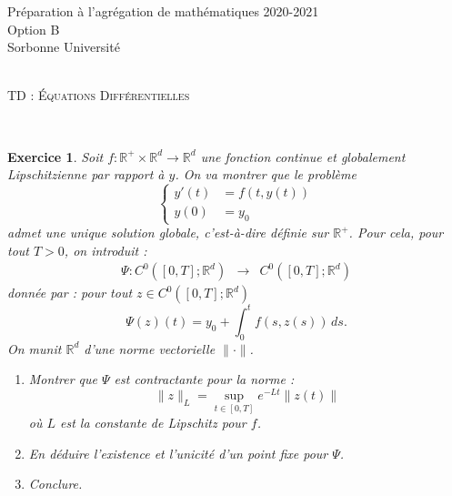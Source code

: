 \documentclass[11pt]{article}
\date{}
\author{}
\newcommand{\R}{\ensuremath{\mathbb R}}
\theoremstyle{exostyle}
\newtheorem{exercice}{Exercice}
\begin{document}
\noindent Préparation à l'agrégation de mathématiques  
\hfill
2020-2021 \\
Option B \hfill  ~\\ %
Sorbonne Université \hfill  ~\\ 
\noindent {\rule{\textwidth}{.2mm}}\\[-3mm]
\begin{center}
\large{\textsc{TD : \'Equations Différentielles  } }\\[-3mm]
\end{center}
\noindent {\rule{\textwidth}{.2mm}}\\

\begin{exercice}
Soit $f:\mathbb{R}^+ \times \R^d \rightarrow \R^d$ une fonction continue et globalement Lipschitzienne par rapport à $y$. On va montrer que le problème
$$
\left\{ 
\begin{aligned}
y'(t) &=f(t,y(t))\\
y(0)&=y_0
\end{aligned}
\right.
$$
admet une unique solution globale, c'est-à-dire définie sur $\R^+$. Pour cela, pour tout $T>0$, on introduit :
$$
\begin{aligned}
\Psi : C^0([0,T];\R^d) &\rightarrow &C^0([0,T];\R^d)
\end{aligned}
$$
donnée par : pour tout $z \in C^0([0,T];\R^d)$
$$
\Psi(z)(t)= y_0+\int_0^t f(s,z(s))\,ds.
$$
On munit $\R^d$ d'une norme vectorielle $\|\cdot \|$.
\begin{enumerate}
\item Montrer que $\Psi$ est contractante pour la norme :
$$
\|z\|_L=\sup_{t \in [0,T]}e^{-Lt}\|z(t)\|
$$
où $L$ est la constante de Lipschitz pour $f$. 
\item En déduire l'existence et l'unicité d'un point fixe pour $\Psi$.
\item Conclure.
\end{enumerate}

\end{exercice}
\end{document}
